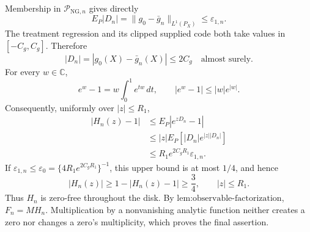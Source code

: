 Membership in \(\mathcal P_{\mathrm{NG},n}\) gives directly
\[
 E_P|D_n|
 =\lVert g_0-\bar g_n\rVert_{L^1(P_X)}
 \le\varepsilon_{1,n}.
\]
The treatment regression and its clipped supplied code both take values in \([-C_g,C_g]\).  Therefore
\[
 |D_n|=|g_0(X)-\bar g_n(X)|\le2C_g
 \quad\text{almost surely}.
\]
For every \(w\in\mathbb C\),
\[
 e^w-1=w\int_0^1e^{tw}\,dt,
 \qquad
 |e^w-1|\le|w|e^{|w|}.
\]
Consequently, uniformly over \(|z|\le R_1\),
\[
 \begin{aligned}
 |H_n(z)-1|
 &\le E_P|e^{zD_n}-1|\\
 &\le |z|E_P[|D_n|e^{|z||D_n|}]\\
 &\le R_1e^{2C_gR_1}\varepsilon_{1,n}.
 \end{aligned}
\]
If \(\varepsilon_{1,n}\le\varepsilon_0=\{4R_1e^{2C_gR_1}\}^{-1}\), this upper bound is at most \(1/4\), and hence
\[
 |H_n(z)|\ge1-|H_n(z)-1|\ge\frac34,
 \qquad |z|\le R_1.
\]
Thus \(H_n\) is zero-free throughout the disk.  By \(\text{lem:observable-factorization}\), \(F_n=MH_n\).  Multiplication by a nonvanishing analytic function neither creates a zero nor changes a zero's multiplicity, which proves the final assertion.